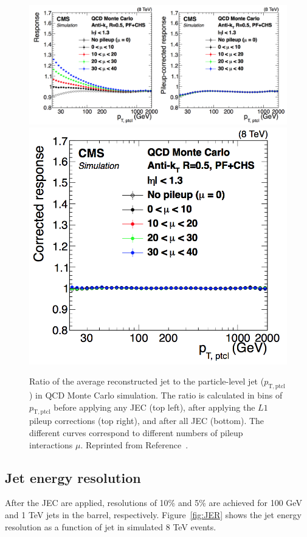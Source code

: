  \begin{figure}[h!]
	\centering
	\includegraphics[width=1.0\linewidth]{Figures/EventReconstruction/JEC1.png}
	\includegraphics[width=0.5\linewidth]{Figures/EventReconstruction/JEC2.png}
       \caption[Ratio of the average reconstructed jet \pt to the particle-level jet \pt in QCD Monte Carlo simulation.]
       {Ratio of the average reconstructed jet \pt to the particle-level jet \pt ($p_{\mathrm{T,ptcl}}$) in QCD Monte Carlo simulation.
       The ratio is calculated in bins of $p_{\mathrm{T,ptcl}}$ before applying any JEC (top left), after applying the $L1$ pileup corrections
       (top right), and after all JEC (bottom). The different curves correspond to different numbers of pileup interactions $\mu$.
       Reprinted from Reference~\cite{JEC}.}
       \label{fig:JEC}
\end{figure}

\subsection{Jet energy resolution}
\label{sec:JER}

After the JEC are applied, resolutions of 10\% and 5\% are achieved for 100 GeV and 1 TeV jets in the barrel, respectively. Figure~\ref{fig:JER} shows the jet energy resolution as a function of jet \pt in simulated 8 TeV events. 

